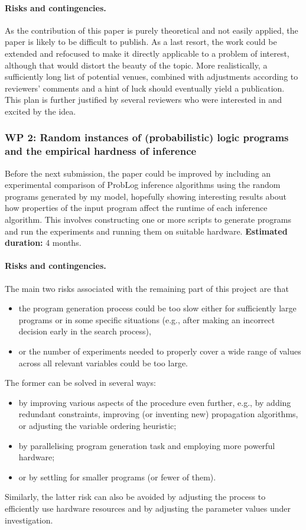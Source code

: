 \documentclass{article}
\begin{document}
\paragraph{Risks and contingencies.} As the contribution of this paper is purely
theoretical and not easily applied, the paper is likely to be difficult to
publish. As a last resort, the work could be extended and refocused to make it
directly applicable to a problem of interest, although that would distort the
beauty of the topic. More realistically, a sufficiently long list of potential
venues, combined with adjustments according to reviewers' comments and a hint
of luck should eventually yield a publication. This plan is further justified by
several reviewers who were interested in and excited by the idea.

\subsubsection{WP 2: Random instances of (probabilistic) logic programs and the
  empirical hardness of inference}

Before the next submission, the paper could be improved by including an
experimental comparison of ProbLog inference algorithms using the random
programs generated by my model, hopefully showing interesting results about how
properties of the input program affect the runtime of each inference algorithm.
This involves constructing one or more scripts to generate programs and run the
experiments and running them on suitable hardware. {\bf Estimated duration:} 4
months.

\paragraph{Risks and contingencies.} The main two risks associated with the
remaining part of this project are that
\begin{itemize}
\item the program generation process could be too slow either for sufficiently
  large programs or in some specific situations (e.g., after making an incorrect
  decision early in the search process),
\item or the number of experiments needed to properly cover a wide range of
  values across all relevant variables could be too large.
\end{itemize}
The former can be solved in several ways:
\begin{itemize}
\item by improving various aspects of the procedure even further, e.g., by
  adding redundant constraints, improving (or inventing new) propagation
  algorithms, or adjusting the variable ordering heuristic;
\item by parallelising program generation task and employing more powerful
  hardware;
\item or by settling for smaller programs (or fewer of them).
\end{itemize}
Similarly, the latter risk can also be avoided by adjusting the process to
efficiently use hardware resources and by adjusting the parameter values under
investigation.
\end{document}
